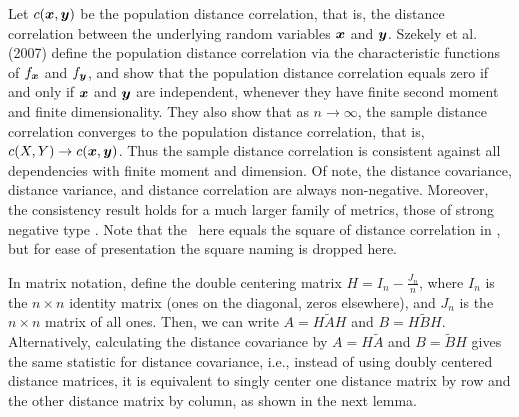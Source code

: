 \documentclass[11pt]{article}
\begin{document}
Let $c(\boldsymbol{x},\boldsymbol{y})$ be the population distance correlation, that is, the distance correlation between the underlying random variables $\boldsymbol{x}$ and $\boldsymbol{y}$. Szekely et al. (2007)  define the population distance correlation  via the characteristic functions of $f_{\boldsymbol{x}}$ and $f_{\boldsymbol{y}}$, and show that the population distance correlation equals zero if and only if $\boldsymbol{x}$ and $\boldsymbol{y}$ are independent, whenever they have finite second moment and finite dimensionality.
They also show that  as $n \rightarrow \infty$, the sample distance correlation converges to the population distance correlation, that is, $c(X,Y) \rightarrow c(\boldsymbol{x},\boldsymbol{y})$. Thus the sample distance correlation is consistent against all dependencies with finite moment and dimension. 
Of note, the distance covariance, distance variance, and distance correlation are always non-negative.  Moreover,  the consistency result holds for a much larger family of metrics, those of strong negative type  \cite{Lyons2013}. 
Note that the \Dcorr~here equals the square of distance correlation in \cite{SzekelyRizzoBakirov2007}, but for ease of presentation the square naming is dropped here.

In matrix notation, define the double centering matrix $H=I_{n}-\frac{J_{n}}{n}$, where $I_n$ is the $n \times n$ identity matrix (ones on the diagonal, zeros elsewhere), and $J_n$ is the $n \times n$ matrix of all ones. Then, we can write  $A=H\tilde{A}H$ and $B=H\tilde{B}H$.
% 
Alternatively, calculating the distance covariance by $A=H\tilde{A}$ and $B=\tilde{B}H$ gives the same statistic for distance covariance, i.e., instead of using doubly centered distance matrices, it is equivalent to singly center one distance matrix by row and the other distance matrix by column, as shown in the next lemma.
\end{document}

